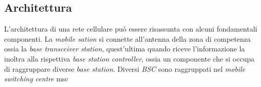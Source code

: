 \clearpage

\subsection{Architettura}
L'architettura di una rete cellulare può essere risassunta con alcuni fondamentali componenti. La \textit{mobile sation} si connette all'antenna
della zona di competenza ossia la \textit{base transceiver station}, quest'ultima quando riceve l'informazione la inoltra alla rispettiva \textit{base station controller}, ossia
un componente che si occupa di raggruppare diverse \textit{base station}. 
Diversi \textit{BSC} sono raggruppati nel \textit{mobile switching centre} \gls{msc}